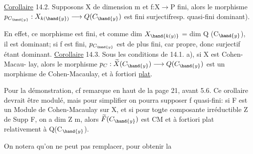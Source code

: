 \uline{Corollaire} 14.2. Supposons X de dimension m et f:X$\to$P fini, alors
le morphisme $p_{C_{\hand{y}}} : X_{k(\hand{y})} \longrightarrow Q(C_{\hand{y}})$ est fini surjectif\hand{(}resp. quasi-fini
dominant).

En effet, ce morphisme est fini, et comme dim $X_{\hand{k(y)}}$ = dim Q (C$_{\hand{y}}$), il est
dominant;  si f est fini, $p_{C_{\hand{y}}}$ est de plus fini,
 car propre, donc surjectif étant dominant.
\uline{Corollaire} 14.3. Sous les conditions de 14.1. a), si X est Cohen-Macau-%
lay, alors le morphisme $p_{C} : \widetilde{X}(C_{\hand{y}}) \longrightarrow Q(C_{\hand{y}})$ est un morphisme de
Cohen-Macaulay, et à fortiori \uline{plat}.

Pour la démonstration, cf remarque en haut de la page 21, avant 5.6.
Ce orollaire devrait être modulé, mais pour simplifier on pourra
supposer f quasi-fini: si F est un Module de Cohen-Macaulay sur X, et si
pour to\uline{u}te composante irréductible Z de Supp F, on a dim Z  m, alors
$\widetilde{F}(C_{\hand{y}})$ est CM \hand{(}et à fortiori plat\hand{)} relativement à Q(C$_{\hand{y}}$).

On notera qu'on ne peut pas remplacer, pour obtenir la

